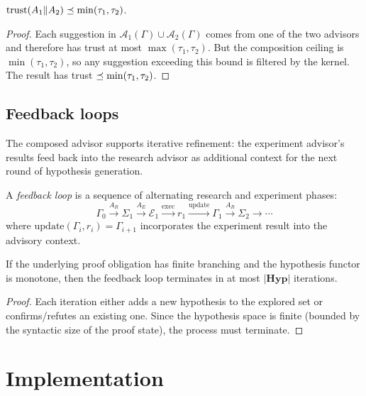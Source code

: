 \documentclass[11pt]{article}
\begin{document}
\begin{lemma}\label{lem:partrust}
$\mathrm{trust}(A_1 \| A_2) \preceq \min(\tau_1, \tau_2)$.
\end{lemma}
\begin{proof}
Each suggestion in $\mathcal{A}_1(\Gamma) \cup
\mathcal{A}_2(\Gamma)$ comes from one of the two advisors
and therefore has trust at most $\max(\tau_1, \tau_2)$.
But the composition ceiling is $\min(\tau_1, \tau_2)$, so
any suggestion exceeding this bound is filtered by the
kernel.  The result has trust $\preceq \min(\tau_1, \tau_2)$.
\end{proof}

\subsection{Feedback loops}

The composed advisor supports iterative refinement:
the experiment advisor's results feed back into the
research advisor as additional context for the next round
of hypothesis generation.

\begin{definition}\label{def:feedback}
A \emph{feedback loop} is a sequence of alternating
research and experiment phases:
\[
  \Gamma_0 \xrightarrow{A_R} \Sigma_1
  \xrightarrow{A_E} \mathcal{E}_1
  \xrightarrow{\mathrm{exec}} r_1
  \xrightarrow{\mathrm{update}} \Gamma_1
  \xrightarrow{A_R} \Sigma_2 \xrightarrow{} \cdots
\]
where $\mathrm{update}(\Gamma_i, r_i) = \Gamma_{i+1}$
incorporates the experiment result into the advisory
context.
\end{definition}

\begin{proposition}\label{prop:fbconv}
If the underlying proof obligation has finite branching
and the hypothesis functor is monotone, then the feedback
loop terminates in at most $|\mathbf{Hyp}|$ iterations.
\end{proposition}
\begin{proof}
Each iteration either adds a new hypothesis to the
explored set or confirms/refutes an existing one.
Since the hypothesis space is finite (bounded by the
syntactic size of the proof state), the process must
terminate.
\end{proof}

\section{Implementation}\label{sec:code}
\end{document}
